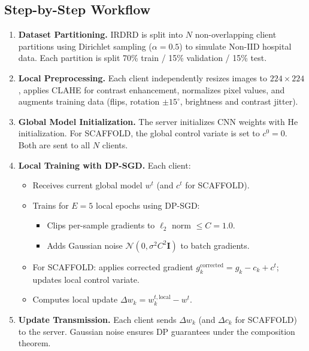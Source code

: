 \documentclass[12pt, a4paper]{article}
\begin{document}
\subsection{Step-by-Step Workflow}

\begin{enumerate}[leftmargin=*, label=\textbf{Step \arabic*.}]

\item \textbf{Dataset Partitioning.}
IRDRD is split into $N$ non-overlapping client partitions using Dirichlet sampling ($\alpha = 0.5$) to simulate Non-IID hospital data. Each partition is split 70\% train / 15\% validation / 15\% test.

\item \textbf{Local Preprocessing.}
Each client independently resizes images to $224 \times 224$, applies CLAHE for contrast enhancement, normalizes pixel values, and augments training data (flips, rotation $\pm 15^{\circ}$, brightness and contrast jitter).

\item \textbf{Global Model Initialization.}
The server initializes CNN weights with He initialization. For SCAFFOLD, the global control variate is set to $c^0 = 0$. Both are sent to all $N$ clients.

\item \textbf{Local Training with DP-SGD.}
Each client:
\begin{itemize}
  \item Receives current global model $w^t$ (and $c^t$ for SCAFFOLD).
  \item Trains for $E = 5$ local epochs using DP-SGD:
    \begin{itemize}
      \item Clips per-sample gradients to $\ell_2$ norm $\leq C = 1.0$.
      \item Adds Gaussian noise $\mathcal{N}(0, \sigma^2 C^2 \mathbf{I})$ to batch gradients.
    \end{itemize}
  \item For SCAFFOLD: applies corrected gradient $g_k^{\text{corrected}} = g_k - c_k + c^t$; updates local control variate.
  \item Computes local update $\Delta w_k = w_k^{t,\text{local}} - w^t$.
\end{itemize}

\item \textbf{Update Transmission.}
Each client sends $\Delta w_k$ (and $\Delta c_k$ for SCAFFOLD) to the server. Gaussian noise ensures DP guarantees under the composition theorem.


\end{enumerate}
\end{document}
